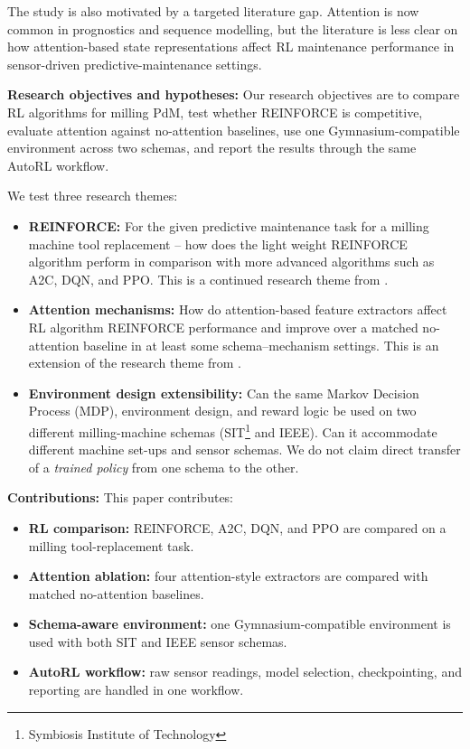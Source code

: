 \documentclass[sn-basic]{sn-jnl}%
\begin{document}
The study is also motivated by a targeted literature gap. Attention is now common in prognostics and sequence modelling, but the literature is less clear on how attention-based state representations affect RL maintenance performance in sensor-driven predictive-maintenance settings.

\textbf{Research objectives and hypotheses:}
Our research objectives are to compare RL algorithms for milling PdM, test whether \textsc{REINFORCE} is competitive, evaluate attention against no-attention baselines, use one Gymnasium-compatible environment across two schemas, and report the results through the same AutoRL workflow.

We test three research themes:
\begin{itemize}
    \item \textbf{REINFORCE:} For the given predictive maintenance task for a milling machine tool replacement -- how does the light weight \textsc{REINFORCE} algorithm perform in comparison with more advanced algorithms such as \textsc{A2C}, \textsc{DQN}, and \textsc{PPO}. This is a continued research theme from \cite{Siraskar2025}.
	\item \textbf{Attention mechanisms:} How do attention-based feature extractors affect RL algorithm \textsc{REINFORCE} performance and improve over a matched no-attention baseline in at least some schema--mechanism settings. This is an extension of the research theme from \cite{Siraskar2024}.
	\item \textbf{Environment design extensibility:} Can the same Markov Decision Process (MDP), environment design, and reward logic be used on two different milling-machine schemas (SIT\footnote{Symbiosis Institute of Technology} and IEEE). Can it accommodate different machine set-ups and sensor schemas. We do not claim direct transfer of a \emph{trained policy} from one schema to the other.
\end{itemize}

\textbf{Contributions:}
This paper contributes:
\begin{itemize}
    \item \textbf{RL comparison:} \textsc{REINFORCE}, \textsc{A2C}, \textsc{DQN}, and \textsc{PPO} are compared on a milling tool-replacement task.
    \item \textbf{Attention ablation:} four attention-style extractors are compared with matched no-attention baselines.
    \item \textbf{Schema-aware environment:} one Gymnasium-compatible environment is used with both SIT and IEEE sensor schemas.
    \item \textbf{AutoRL workflow:} raw sensor readings, model selection, checkpointing, and reporting are handled in one workflow.
\end{itemize}
\end{document}

